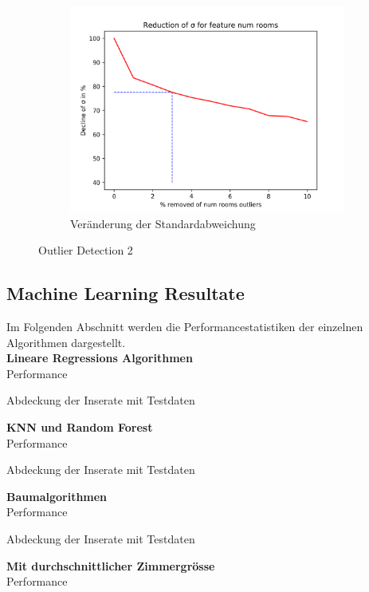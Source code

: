 \begin{figure}[h]
\begin{subfigure}{.5\textwidth}
  \includegraphics[width=\linewidth]{images/anhang/outlier_detection/num_rooms_std.png}
  \caption{Veränderung der Standardabweichung}
\end{subfigure}
\caption{Outlier Detection 2}
\end{figure}

\clearpage
\subsection{Machine Learning Resultate}
Im Folgenden Abschnitt werden die Performancestatistiken der einzelnen Algorithmen dargestellt.\\[2ex]
\textbf{Lineare Regressions Algorithmen}\\
Performance


Abdeckung der Inserate mit Testdaten


%
\newpage
\textbf{KNN und Random Forest}\\
Performance


Abdeckung der Inserate mit Testdaten


%
\newpage
\textbf{Baumalgorithmen}\\
Performance


Abdeckung der Inserate mit Testdaten


%
\newpage
\textbf{Mit durchschnittlicher Zimmergrösse}\\
Performance

